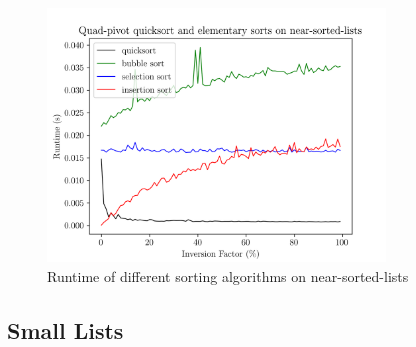 \documentclass[titlepage, 12pt]{article}
\begin{document}
\begin{figure}[h]
  \centering
  \includegraphics[width=0.8\textwidth]{near-sorted} 
  \caption{Runtime of different sorting algorithms on near-sorted-lists}
  \label{fig:near-sorted}
\end{figure}

\subsection{Small Lists}
\end{document}
